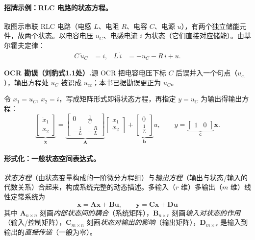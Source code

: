 \paragraph{招牌示例：RLC 电路的状态方程。}
取图示串联 RLC 电路（电感 $L$、电阻 $R$、电容 $C$、电源 $u$），有两个独立储能元件，故两个状态。以电容电压 $u_C$、电感电流 $i$ 为状态（它们直接对应储能）。由基尔霍夫定律：
\begin{align}
  C\,\dot{u}_C &= i, &
  L\,\dot{i} &= -u_C - R\,i + u.
  \label{eq:ssb-rlc-phys}
\end{align}
\begin{note}
\textbf{OCR 勘误（刘豹式1.1处）.}\;源 OCR 把电容电压下标 $C$ 后误并入一个句点（$u_{c.}$），输出方程处 $u_C$ 被识成 $u_{cc}$；本书已据勘误更正为 $u_C$\cite{liubao2006modern}。
\end{note}
令 $x_1=u_C,\,x_2=i$，写成矩阵形式即得状态方程，再指定 $y=u_C$ 为输出得输出方程：
\begin{equation}
  \underbrace{\begin{bmatrix}\dot{x}_1\\\dot{x}_2\end{bmatrix}}_{\dot{\mathbf{x}}}
  =\underbrace{\begin{bmatrix}0&\tfrac{1}{C}\\[2pt]-\tfrac{1}{L}&-\tfrac{R}{L}\end{bmatrix}}_{\mathbf{A}}
  \begin{bmatrix}x_1\\x_2\end{bmatrix}
  +\underbrace{\begin{bmatrix}0\\\tfrac{1}{L}\end{bmatrix}}_{\mathbf{b}}u,
  \qquad
  y=\underbrace{\begin{bmatrix}1&0\end{bmatrix}}_{\mathbf{c}}\mathbf{x}.
  \label{eq:ssb-rlc-ss}
\end{equation}

\paragraph{形式化：一般状态空间表达式。}
\begin{definition}[线性定常系统的状态空间表达式]\label{def:ssb-ss}
\emph{状态方程}（由状态变量构成的一阶微分方程组）与\emph{输出方程}（输出与状态/输入的代数关系）合起来，构成系统完整的动态描述。多输入（$r$ 维）多输出（$m$ 维）线性定常系统为
\begin{equation}
  \boxed{\;\dot{\mathbf{x}}=\mathbf{A}\mathbf{x}+\mathbf{B}\mathbf{u},\qquad \mathbf{y}=\mathbf{C}\mathbf{x}+\mathbf{D}\mathbf{u}\;}
  \label{eq:ssb-mimo}
\end{equation}
其中 $\mathbf{A}_{n\times n}$ 刻画\emph{内部状态间的耦合}（系统矩阵），$\mathbf{B}_{n\times r}$ 刻画\emph{输入对状态的作用}（输入/控制矩阵），$\mathbf{C}_{m\times n}$ 刻画\emph{状态对输出的影响}（输出矩阵），$\mathbf{D}_{m\times r}$ 是输入到输出的\emph{直接传递}（一般为零）。
\end{definition}

